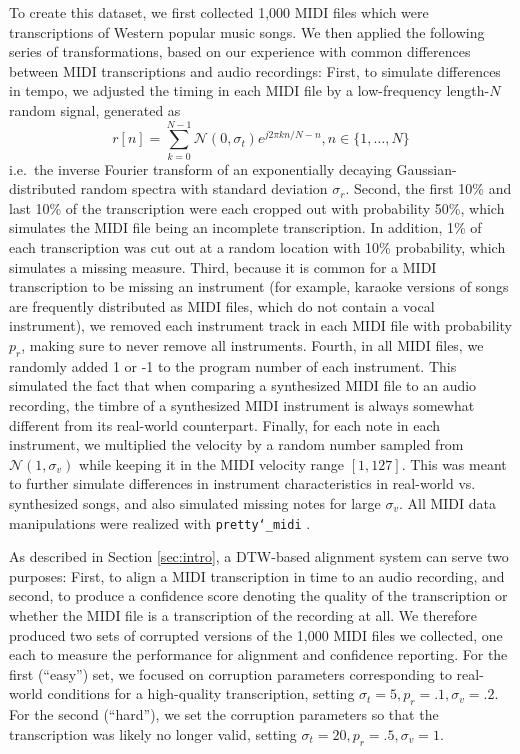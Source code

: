 \documentclass{article}
\begin{document}
To create this dataset, we first collected 1,000 MIDI files which were transcriptions of Western popular music songs.
We then applied the following series of transformations, based on our experience with common differences between MIDI transcriptions and audio recordings:
First, to simulate differences in tempo, we adjusted the timing in each MIDI file by a low-frequency length-$N$ random signal, generated as
$$
r[n] = \sum_{k = 0}^{N - 1} \mathcal{N}(0, \sigma_t) e^{j2\pi kn/N - n}, n \in \{1, \ldots, N\}
$$
i.e.\ the inverse Fourier transform of an exponentially decaying Gaussian-distributed random spectra with standard deviation $\sigma_r$.
Second, the first 10\% and last 10\% of the transcription were each cropped out with probability 50\%, which simulates the MIDI file being an incomplete transcription.
In addition, 1\% of each transcription was cut out at a random location with 10\% probability, which simulates a missing measure.
Third, because it is common for a MIDI transcription to be missing an instrument (for example, karaoke versions of songs are frequently distributed as MIDI files, which do not contain a vocal instrument), we removed each instrument track in each MIDI file with probability $p_r$, making sure to never remove all instruments.
Fourth, in all MIDI files, we randomly added 1 or -1 to the program number of each instrument.
This simulated the fact that when comparing a synthesized MIDI file to an audio recording, the timbre of a synthesized MIDI instrument is always somewhat different from its real-world counterpart.
Finally, for each note in each instrument, we multiplied the velocity by a random number sampled from $\mathcal{N}(1, \sigma_v)$ while keeping it in the MIDI velocity range $[1, 127]$.
This was meant to further simulate differences in instrument characteristics in real-world vs. synthesized songs, and also simulated missing notes for large $\sigma_v$.
All MIDI data manipulations were realized with \texttt{pretty\char`_midi} \cite{raffel2014pretty_midi}.

As described in Section \ref{sec:intro}, a DTW-based alignment system can serve two purposes: First, to align a MIDI transcription in time to an audio recording, and second, to produce a confidence score denoting the quality of the transcription or whether the MIDI file is a transcription of the recording at all.
We therefore produced two sets of corrupted versions of the 1,000 MIDI files we collected, one each to measure the performance for alignment and confidence reporting.
For the first (``easy'') set, we focused on corruption parameters corresponding to real-world conditions for a high-quality transcription, setting $\sigma_t = 5, p_r = .1, \sigma_v = .2$.
For the second (``hard''), we set the corruption parameters so that the transcription was likely no longer valid, setting $\sigma_t = 20, p_r = .5, \sigma_v = 1$.
\end{document}
